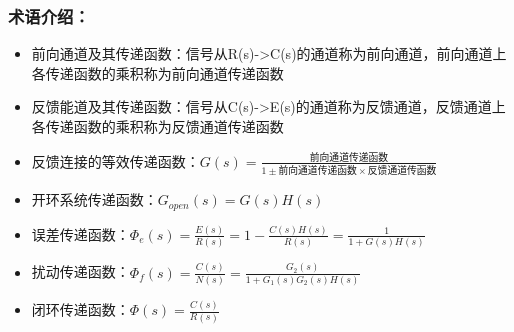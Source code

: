 \documentclass{article}
\begin{document}
\begin{frame}
\frametitle{术语介绍：}
\label{sec-3-1-7}

\begin{itemize}
\item <2-> 前向通道及其传递函数：信号从R(s)->C(s)的通道称为前向通道，前向通道上各传递函数的乘积称为前向通道传递函数
\item <3-> 反馈能道及其传递函数：信号从C(s)->E(s)的通道称为反馈通道，反馈通道上各传递函数的乘积称为反馈通道传递函数
\item <4-> 反馈连接的等效传递函数：$G(s)=\frac{\text{前向通道传递函数}}{1\pm\text{前向通道传递函数}\times\text{反馈通道传函数}}$
\item <5-> 开环系统传递函数：$G_{open}(s)=G(s)H(s)$
\item <6-> 误差传递函数：$\Phi_e(s)=\frac{E(s)}{R(s)}=1-\frac{C(s)H(s)}{R(s)}=\frac{1}{1+G(s)H(s)}$
\item <7-> 扰动传递函数：$\Phi_f(s)=\frac{C(s)}{N(s)}=\frac{G_2(s)}{1+G_1(s)G_2(s)H(s)}$
\item <8-> 闭环传递函数：$\Phi(s)=\frac{C(s)}{R(s)}$
\end{itemize}
\end{frame}
\end{document}
